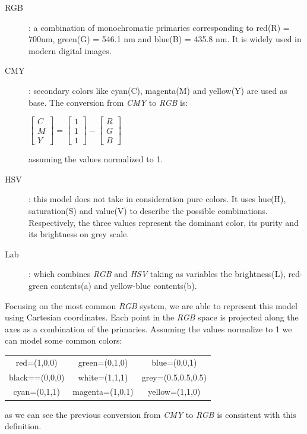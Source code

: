 \documentclass[../main.tex]{subfiles}
\begin{document}
\begin{description}
    \item[RGB]: a combination of monochromatic primaries corresponding to red(R) = 700nm,
    green(G) = 546.1 nm and blue(B) = 435.8 nm. It is widely used in modern digital images.
    \item[CMY]: secondary colors like cyan(C), magenta(M) and yellow(Y) are used as base. The conversion from \textit{CMY} to \textit{RGB} is: 
    
    \begin{center}
    \begin{math}
    \begin{bmatrix}
    C \\ M \\ Y
    \end{bmatrix} = \begin{bmatrix}
    1 \\ 1 \\ 1
    \end{bmatrix} - 
    \begin{bmatrix}
    R \\ G \\ B
    \end{bmatrix}
    \end{math}
    \end{center}
    
    assuming the values normalized to 1.
    \item[HSV]: this model does not take in consideration pure colors. It uses hue(H), saturation(S) and value(V) to describe the possible combinations. Respectively, the three values represent the dominant color, its purity and its brightness on grey scale.
    \item[Lab]: which combines \textit{RGB} and \textit{HSV} taking as variables the brightness(L), red-green contents(a) and yellow-blue contents(b).
\end{description}

Focusing on the most common \textit{RGB} system,  we are able to represent this model using Cartesian coordinates. Each point in the  \textit{RGB} space is projected along the axes as a combination of the primaries. Assuming the values normalize to 1 we can model some common colors:

\begin{center}
\begin{tabular}{ c c c }
 red=(1,0,0) & green=(0,1,0) & blue=(0,0,1) \\ 
 black==(0,0,0) & white=(1,1,1) & grey=(0.5,0.5,0.5) \\  
 cyan=(0,1,1) & magenta=(1,0,1) & yellow=(1,1,0)    
\end{tabular}
\end{center}
as we can see the previous conversion from \textit{CMY} to \textit{RGB} is consistent with this definition.
\end{document}
